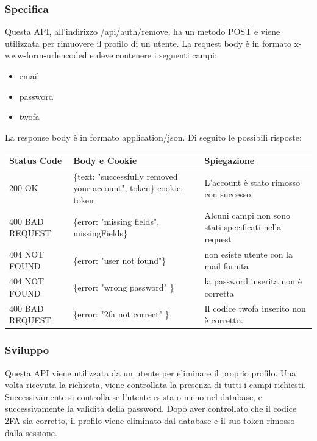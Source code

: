 \documentclass{report}
\begin{document}
\subsubsection*{Specifica}
Questa API, all'indirizzo /api/auth/remove, ha un metodo POST e viene utilizzata per rimuovere il profilo di un utente.
La request body è in formato x-www-form-urlencoded e deve contenere i seguenti campi:
\begin{itemize}
	\item email
	\item password
	\item twofa
\end{itemize}
La response body è in formato application/json. Di seguito le possibili risposte:
\begin{center} %
	\centering
	\begin{tabular}{ |p{4cm}|p{5cm}|p{4cm}| }
		\hline
		\centering Status Code & \qquad\quad Body e Cookie & \qquad\qquad Spiegazione\\ %
		\hline
		200 OK & \{text: "successfully removed your account", token\} cookie: token & L'account è stato rimosso con successo	\\
		\hline
		400 BAD REQUEST & \{error: "missing fields", missingFields\} & Alcuni campi non sono stati specificati nella request\\ %
		\hline
		404 NOT FOUND & \{error: "user not found"\} & non esiste utente con la mail fornita \\%
		\hline
		404 NOT FOUND & \{error: "wrong password" \} & la password inserita non è corretta \\
		\hline
		400 BAD REQUEST & \{error: "2fa not correct" \} & Il codice twofa inserito non è corretto. \\
		\hline
	\end{tabular}
\end{center}
\subsubsection*{Sviluppo}
Questa API viene utilizzata da un utente per eliminare il proprio profilo.
Una volta ricevuta la richiesta, viene controllata la presenza di tutti i campi richiesti.
Successivamente si controlla se l'utente esista o meno nel database, e successivamente la validità della password.
Dopo aver controllato che il codice 2FA sia corretto, il profilo viene eliminato dal database e il suo token rimosso dalla sessione.
\end{document}
